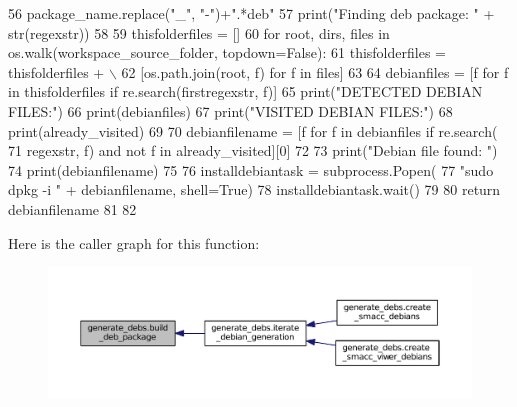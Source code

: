 \begin{DoxyCode}
56         package\_name.replace(\textcolor{stringliteral}{"\_"}, \textcolor{stringliteral}{"-"})+\textcolor{stringliteral}{".*deb"}
57     print(\textcolor{stringliteral}{"Finding deb package: "} + str(regexstr))
58 
59     thisfolderfiles = []
60     \textcolor{keywordflow}{for} root, dirs, files \textcolor{keywordflow}{in} os.walk(workspace\_source\_folder, topdown=\textcolor{keyword}{False}):
61         thisfolderfiles = thisfolderfiles + \(\backslash\)
62             [os.path.join(root, f) \textcolor{keywordflow}{for} f \textcolor{keywordflow}{in} files]
63 
64     debianfiles = [f \textcolor{keywordflow}{for} f \textcolor{keywordflow}{in} thisfolderfiles \textcolor{keywordflow}{if} re.search(firstregexstr, f)]
65     print(\textcolor{stringliteral}{"DETECTED DEBIAN FILES:"})
66     print(debianfiles)
67     print(\textcolor{stringliteral}{"VISITED DEBIAN FILES:"})
68     print(already\_visited)
69 
70     debianfilename = [f \textcolor{keywordflow}{for} f \textcolor{keywordflow}{in} debianfiles \textcolor{keywordflow}{if} re.search(
71         regexstr, f) \textcolor{keywordflow}{and} \textcolor{keywordflow}{not} f \textcolor{keywordflow}{in} already\_visited][0]
72 
73     print(\textcolor{stringliteral}{"Debian file found: "})
74     print(debianfilename)
75 
76     installdebiantask = subprocess.Popen(
77         \textcolor{stringliteral}{"sudo dpkg -i "} + debianfilename, shell=\textcolor{keyword}{True})
78     installdebiantask.wait()
79 
80     \textcolor{keywordflow}{return} debianfilename
81 
82 
\end{DoxyCode}


Here is the caller graph for this function\+:
\nopagebreak
\begin{figure}[H]
\begin{center}
\leavevmode
\includegraphics[width=350pt]{namespacegenerate__debs_aa70c3f4917ddc57b13eaed8501f571a8_icgraph}
\end{center}
\end{figure}


